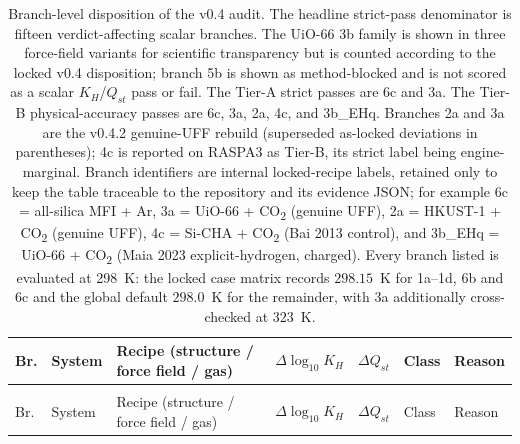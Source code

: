 {\scriptsize
\setlength{\tabcolsep}{3pt}
\renewcommand{\arraystretch}{1.25}
\begin{longtable}{@{}>{\raggedright\arraybackslash}p{}>{\raggedright\arraybackslash}p{}>{\raggedright\arraybackslash}p{}r r >{\raggedright\arraybackslash}p{}>{\raggedright\arraybackslash}p{}@{}}
\caption{Branch-level disposition of the v0.4 audit. The headline strict-pass
denominator is fifteen verdict-affecting scalar branches. The UiO-66 3b family
is shown in three force-field variants for scientific transparency but is
counted according to the locked v0.4 disposition; branch 5b is shown as
method-blocked and is not scored as a scalar $K_H$/$Q_{st}$ pass or fail. The
Tier-A strict passes are 6c and 3a. The Tier-B physical-accuracy passes are 6c,
3a, 2a, 4c, and 3b\_EHq. Branches 2a and 3a are the v0.4.2 genuine-UFF rebuild
(superseded as-locked deviations in parentheses); 4c is reported on RASPA3 as
Tier-B, its strict label being engine-marginal. Branch identifiers are internal
locked-recipe labels, retained only to keep the table traceable to the repository
and its evidence JSON; for example 6c = all-silica MFI + Ar, 3a = UiO-66 +
CO\textsubscript{2} (genuine UFF), 2a = HKUST-1 + CO\textsubscript{2} (genuine
UFF), 4c = Si-CHA + CO\textsubscript{2} (Bai 2013 control), and 3b\_EHq = UiO-66 +
CO\textsubscript{2} (Maia 2023 explicit-hydrogen, charged). Every branch listed is
evaluated at 298~K: the locked case matrix records $298.15$~K for 1a--1d, 6b and
6c and the global default $298.0$~K for the remainder, with 3a additionally
cross-checked at $323$~K.}\label{tab:branch-disposition}\\
\toprule
Br. & System & Recipe (structure / force field / gas) & $\Delta\log_{10}K_H$ & $\Delta Q_{st}$ & Class & Reason \\
\midrule
\endfirsthead
\multicolumn{7}{@{}l}{\footnotesize\emph{Table~\ref{tab:branch-disposition}, continued}}\\
\toprule
Br. & System & Recipe (structure / force field / gas) & $\Delta\log_{10}K_H$ & $\Delta Q_{st}$ & Class & Reason \\
\midrule
\endhead

\end{longtable}}
